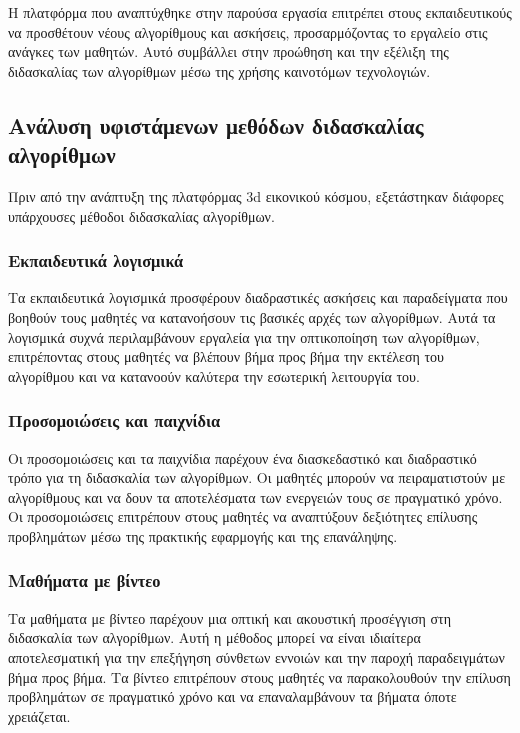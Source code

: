 Η πλατφόρμα που αναπτύχθηκε στην παρούσα εργασία επιτρέπει στους εκπαιδευτικούς να προσθέτουν νέους αλγορίθμους και ασκήσεις, προσαρμόζοντας το εργαλείο στις ανάγκες των μαθητών. Αυτό συμβάλλει στην προώθηση και την εξέλιξη της διδασκαλίας των αλγορίθμων μέσω της χρήσης καινοτόμων τεχνολογιών\cite{__2022}.


\subsection{Ανάλυση υφιστάμενων μεθόδων διδασκαλίας αλγορίθμων}

Πριν από την ανάπτυξη της πλατφόρμας \acrshort{3d} εικονικού κόσμου, εξετάστηκαν διάφορες υπάρχουσες μέθοδοι διδασκαλίας αλγορίθμων.

\subsubsection{Εκπαιδευτικά λογισμικά}

Τα εκπαιδευτικά λογισμικά προσφέρουν διαδραστικές ασκήσεις και παραδείγματα που βοηθούν τους μαθητές να κατανοήσουν τις βασικές αρχές των αλγορίθμων. Αυτά τα λογισμικά συχνά περιλαμβάνουν εργαλεία για την οπτικοποίηση των αλγορίθμων, επιτρέποντας στους μαθητές να βλέπουν βήμα προς βήμα την εκτέλεση του αλγορίθμου και να κατανοούν καλύτερα την εσωτερική λειτουργία του\cite{__2017}.

\subsubsection{Προσομοιώσεις και παιχνίδια}

Οι προσομοιώσεις και τα παιχνίδια παρέχουν ένα διασκεδαστικό και διαδραστικό τρόπο για τη διδασκαλία των αλγορίθμων. Οι μαθητές μπορούν να πειραματιστούν με αλγορίθμους και να δουν τα αποτελέσματα των ενεργειών τους σε πραγματικό χρόνο. Οι προσομοιώσεις επιτρέπουν στους μαθητές να αναπτύξουν δεξιότητες επίλυσης προβλημάτων μέσω της πρακτικής εφαρμογής και της επανάληψης\cite{crepinsek_note_2012}.

\subsubsection{Μαθήματα με βίντεο}

Τα μαθήματα με βίντεο παρέχουν μια οπτική και ακουστική προσέγγιση στη διδασκαλία των αλγορίθμων. Αυτή η μέθοδος μπορεί να είναι ιδιαίτερα αποτελεσματική για την επεξήγηση σύνθετων εννοιών και την παροχή παραδειγμάτων βήμα προς βήμα. Τα βίντεο επιτρέπουν στους μαθητές να παρακολουθούν την επίλυση προβλημάτων σε πραγματικό χρόνο και να επαναλαμβάνουν τα βήματα όποτε χρειάζεται\cite{__2022}.

